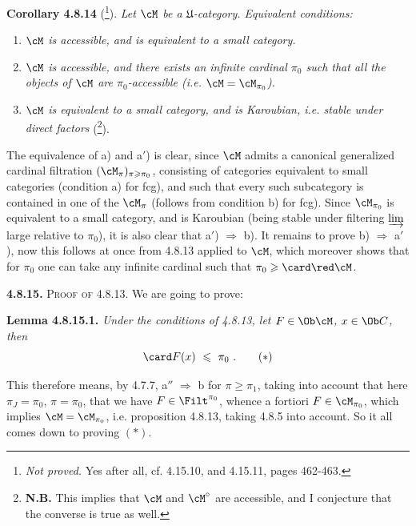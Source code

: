\textbf{Corollary 4.8.14} (\footnote[90]{\textit{Not proved.} Yes after all, cf. 4.15.10, and 4.15.11, pages 462-463.}). \textit{Let $\cM$ be a $\mathfrak{U}$-category. Equivalent conditions:}
\begin{enumerate}[leftmargin=*]
\item[\textit{a)}] \textit{$\cM$ is accessible, and is equivalent to a small category.}
\item[\textit{a$'$)}] \textit{$\cM$ is accessible, and there exists an infinite cardinal $\pi_0$ such that all the objects of $\cM$ are $\pi_0$-accessible (i.e. $\cM = \cM_{\pi_0}$).}
\item[\textit{b)}] \textit{$\cM$ is equivalent to a small category, and is Karoubian, i.e. stable under direct factors} (\footnote[91]{\textbf{N.B.} This implies that $\cM$ and $\cM^{\circ}$ are accessible, and I conjecture that the converse is true as well.}). %
\end{enumerate}

The equivalence of a) and a$'$) is clear, since $\cM$ admits a canonical generalized cardinal filtration $(\cM_{\pi})_{\pi\geqslant\pi_0}$, consisting of categories equivalent to small categories (condition
a) for fcg), and such that every such subcategory is contained in one of the $\cM_{\pi}$ (follows from condition b) for fcg). Since $\cM_{\pi_0}$ is equivalent to a small category, and is Karoubian (being stable under filtering $\varinjlim$ large relative to $\pi_0$), it is also clear that a$'$) $\Longrightarrow$ b). It remains to prove b) $\Longrightarrow$ a$'$), now this follows at once from 4.8.13 applied to $\cM$, which moreover shows that for $\pi_0$ one can take any infinite cardinal such that $\pi_0 \geqslant \card\red\cM$.


\textbf{4.8.15.} \textsc{Proof of} 4.8.13. We are going to prove:

\textbf{Lemma 4.8.15.1.} \textit{Under the conditions of 4.8.13, let $F \in \Ob\cM$, $x \in \Ob C$, then}
\[
\card F(x) \ \leqslant\ \pi_0\ . \tag*{$(*)$}
\]

This therefore means, by 4.7.7, a$''$ $\Longrightarrow$ b for $\pi \geqslant \pi_1$, taking into account that here $\pi_J = \pi_0$, $\pi = \pi_0$, that we have $F \in \Filt^{\pi_0}$, whence a fortiori $F \in \cM_{\pi_0}$, which implies $\cM = \cM_{\pi_0}$, i.e. proposition 4.8.13, taking 4.8.5 into account. So it all comes down to proving $(*)$.


